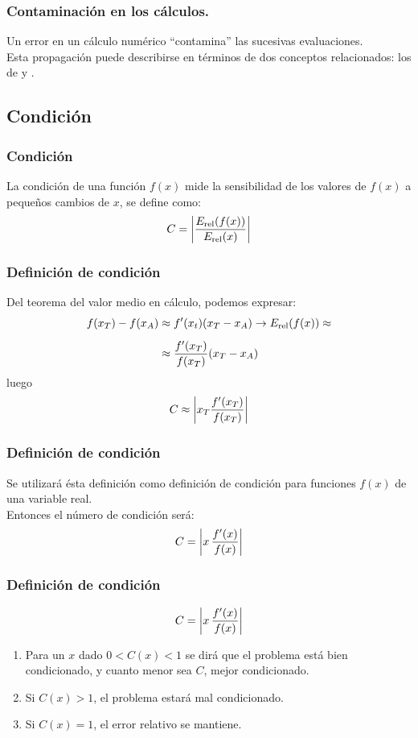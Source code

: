 \documentclass[12pt]{beamer}
\begin{document}
\begin{frame}
\frametitle{Contaminación en los cálculos.}
Un error en un cálculo numérico \enquote{contamina} las sucesivas evaluaciones.
\\
\bigskip
\pause
Esta propagación puede describirse en términos de dos conceptos relacionados: los de  y .
\end{frame}

\subsection{Condición}

\begin{frame}
\frametitle{Condición}
La condición de una función $f (x)$ mide la sensibilidad de los valores de $f (x)$ a pequeños cambios de $x$, se define como:
\pause
\begin{align*}
C = \abs{ \dfrac{E_{\text{rel}} (f (x))}{E_{\text{rel}} (x)} } 
\end{align*}
\end{frame}
\begin{frame}
\frametitle{Definición de condición}
Del teorema del valor medio en cálculo, podemos expresar:
\pause
\begin{align*}
f (x_{T}) - f (x_{A}) & \approx {f}^{\prime} (x_{t})(x_{T} - x_{A}) \rightarrow E_{\text{rel}}(f (x)) \approx \\[0.5em] 
 & \approx \dfrac{ {f}^{\prime} (x_{T})}{f (x_{T})} (x_{T} - x_{A})
\end{align*}
\pause
luego
\begin{align*}
C \approx \abs{ x_{T} \dfrac{{f}^{\prime} (x_{T})}{f (x_{T})} }
\end{align*}
\end{frame}
\begin{frame}
\frametitle{Definición de condición}
Se utilizará ésta definición como definición de condición para funciones $f (x)$ de una variable real.
\\
\bigskip
Entonces el número de condición será:
\pause
\begin{align*}
C = \abs{ x \, \dfrac{{f}^{\prime} (x)}{f(x)} }
\end{align*}
\end{frame}
\begin{frame}
\frametitle{Definición de condición}
\begin{align*}
C = \abs{ x \, \dfrac{{f}^{\prime} (x)}{f(x)} }
\end{align*}
\begin{enumerate}[<+->]
\item Para un $x$ dado $0 < C (x) < 1$ se dirá que el problema está bien condicionado, y cuanto menor sea $C$, mejor condicionado.
\item Si $C (x) > 1$, el problema estará mal condicionado.
\item Si $C (x) = 1$, el error relativo se mantiene.
\end{enumerate}
\end{frame}
\end{document}
